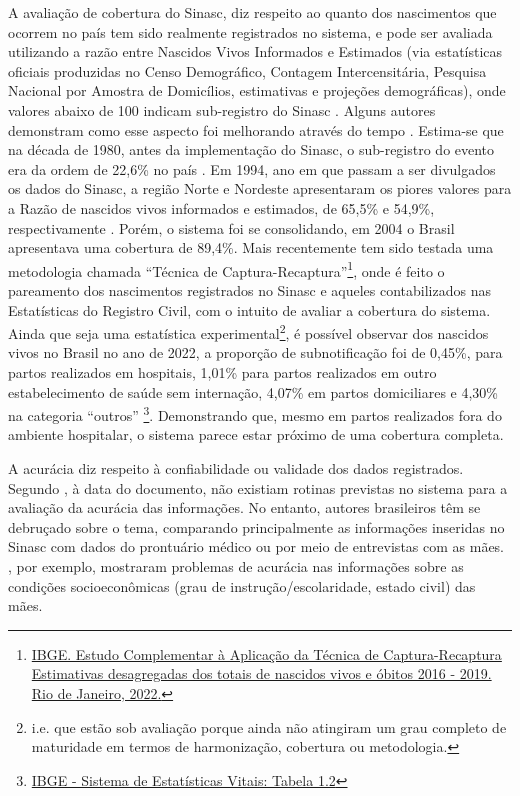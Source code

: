 A avaliação de cobertura do Sinasc, diz respeito ao quanto dos nascimentos que ocorrem no país tem sido realmente registrados no sistema, e pode ser avaliada utilizando a razão entre Nascidos Vivos Informados e Estimados (via estatísticas oficiais produzidas no Censo Demográfico, Contagem Intercensitária, Pesquisa Nacional por Amostra de Domicílios, estimativas e projeções demográficas), onde valores abaixo de 100 indicam sub-registro do Sinasc \cite{rede2002indicadores}. Alguns autores demonstram como esse aspecto foi melhorando através do tempo \cite{gabriel2014evaluation, bonilha2018coverage}. Estima-se que na década de 1980, antes da implementação do Sinasc, o sub-registro do evento era da ordem de 22,6\% no país \cite{IBGEVitais1980}. Em 1994, ano em que passam a ser divulgados os dados do Sinasc, a região Norte e Nordeste apresentaram os piores valores para a Razão de nascidos vivos informados e estimados, de 65,5\% e 54,9\%, respectivamente \cite{rede2002indicadores}. Porém, o sistema foi se consolidando, em 2004 o Brasil apresentava uma cobertura de 89,4\%. Mais recentemente tem sido testada uma metodologia chamada “Técnica de Captura-Recaptura”\footnote{\href{https://biblioteca.ibge.gov.br/visualizacao/livros/liv101927.pdf#page=11.45}{IBGE. Estudo Complementar à Aplicação da Técnica de Captura-Recaptura Estimativas desagregadas dos totais de nascidos vivos e óbitos 2016 - 2019. Rio de Janeiro, 2022.}}, onde é feito o pareamento dos nascimentos registrados no Sinasc e aqueles contabilizados nas Estatísticas do Registro Civil, com o intuito de avaliar a cobertura do sistema. Ainda que seja uma estatística experimental\footnote{i.e. que estão sob avaliação porque ainda não atingiram um grau completo de maturidade em termos de harmonização, cobertura ou metodologia.}, é possível observar dos nascidos vivos no Brasil no ano de 2022, a proporção de subnotificação foi de 0,45\%, para partos realizados em hospitais, 1,01\% para partos realizados em outro estabelecimento de saúde sem internação, 4,07\% em partos domiciliares e 4,30\% na categoria  “outros” \footnote{\href{https://www.ibge.gov.br/estatisticas/sociais/populacao/26176-estimativa-do-sub-registro.html?edicao=32265\&t=resultados}{IBGE - Sistema de Estatísticas Vitais: Tabela 1.2}}. Demonstrando que, mesmo em partos realizados fora do ambiente hospitalar, o sistema parece estar próximo de uma cobertura completa.

A acurácia diz respeito à confiabilidade ou validade dos dados registrados. Segundo , à data do documento, não existiam rotinas previstas no sistema para a avaliação da acurácia das informações. No entanto, autores brasileiros têm se debruçado sobre o tema, comparando principalmente as informações inseridas no Sinasc com dados do prontuário médico ou por meio de entrevistas com as mães. , por exemplo, mostraram problemas de acurácia nas informações sobre as condições socioeconômicas (grau de instrução/escolaridade, estado civil) das mães.

